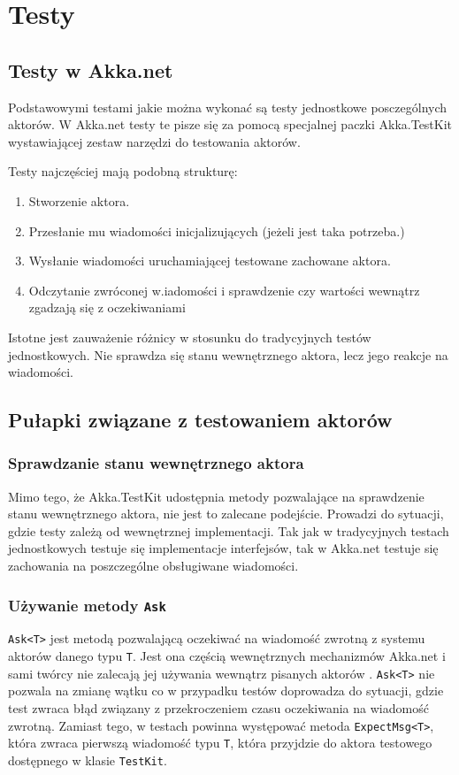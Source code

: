 \chapter{Testy}
\section{Testy w Akka.net}
Podstawowymi testami jakie można wykonać są testy jednostkowe posczególnych aktorów.
W Akka.net testy te pisze się za pomocą specjalnej paczki Akka.TestKit wystawiającej zestaw narzędzi do testowania aktorów.

Testy najczęściej mają podobną strukturę:
\begin{enumerate}
    \item Stworzenie aktora.
    \item Przesłanie mu wiadomości inicjalizujących (jeżeli jest taka potrzeba.)
    \item Wysłanie wiadomości uruchamiającej testowane zachowane aktora.
    \item Odczytanie zwróconej w.iadomości i sprawdzenie czy wartości wewnątrz zgadzają się z oczekiwaniami
\end{enumerate}
Istotne jest zauważenie różnicy w stosunku do tradycyjnych testów jednostkowych. Nie sprawdza się stanu wewnętrznego aktora, lecz jego reakcje na wiadomości.

\section{Pułapki związane z testowaniem aktorów}
\subsection{Sprawdzanie stanu wewnętrznego aktora}
Mimo tego, że Akka.TestKit udostępnia metody pozwalające na sprawdzenie stanu wewnętrznego aktora, nie jest to zalecane podejście. 
Prowadzi do sytuacji, gdzie testy zależą od wewnętrznej implementacji. 
Tak jak w tradycyjnych testach jednostkowych testuje się implementacje interfejsów, tak w Akka.net testuje się zachowania na poszczególne obsługiwane wiadomości.

\subsection{Używanie metody \lstinline{Ask} }
\lstinline{Ask<T>} jest metodą pozwalającą oczekiwać na wiadomość zwrotną z systemu aktorów danego typu \lstinline{T}.
Jest ona częścią wewnętrznych mechanizmów Akka.net i sami twórcy nie zalecają jej używania wewnątrz pisanych aktorów \cite{bib:AkkaNoAsk}. 
\lstinline{Ask<T>} nie pozwala na zmianę wątku co w przypadku testów doprowadza do sytuacji, gdzie test zwraca błąd związany z przekroczeniem czasu oczekiwania na wiadomość zwrotną. Zamiast tego, w testach powinna występować metoda \lstinline{ExpectMsg<T>}, która zwraca pierwszą wiadomość typu \lstinline{T}, która przyjdzie do aktora testowego dostępnego w klasie \lstinline{TestKit}.  

